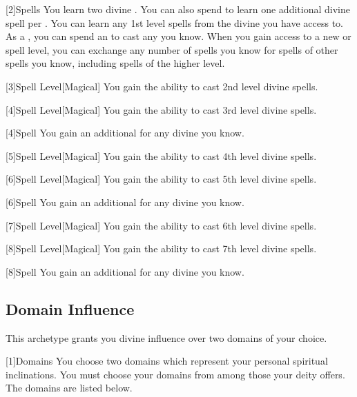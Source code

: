         [2]{Spells} You learn two divine .
        You can also spend  to learn one additional divine spell per .
        You can learn any 1st level spells from the divine  you have access to.
        As a , you can spend an  to cast any  you know.
        When you gain access to a new  or spell level, you can exchange any number of spells you know for spells of other spells you know, including spells of the higher level.

        [3]{Spell Level}[Magical] You gain the ability to cast 2nd level divine spells.

        [4]{Spell Level}[Magical] You gain the ability to cast 3rd level divine spells.

        [4]{Spell} You gain an additional  for any divine  you know.

        [5]{Spell Level}[Magical] You gain the ability to cast 4th level divine spells.

        [6]{Spell Level}[Magical] You gain the ability to cast 5th level divine spells.

        [6]{Spell} You gain an additional  for any divine  you know.

        [7]{Spell Level}[Magical] You gain the ability to cast 6th level divine spells.

        [8]{Spell Level}[Magical] You gain the ability to cast 7th level divine spells.

        [8]{Spell} You gain an additional  for any divine  you know.

    \subsection{Domain Influence}
        This archetype grants you divine influence over two domains of your choice.

        [1]{Domains}
        You choose two domains which represent your personal spiritual inclinations.
        You must choose your domains from among those your deity offers.
        The domains are listed below.

